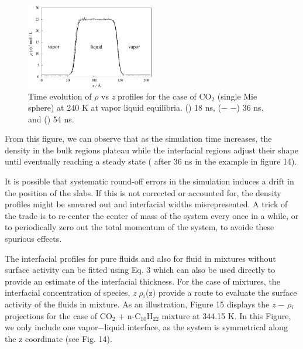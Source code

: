 \documentclass[9pt,bestpractices]{livecoms}
\begin{document}
\begin{figure}
\includegraphics[width=0.5\textwidth]{gfx/Fig_14_2.jpeg}
\caption{Time evolution of {${\rho}$} vs \textit{z} profiles for the case of CO$_{2}$ (single Mie sphere) at 240 K at vapor \textendash{} liquid equilibria. ({\textbullet}{\textbullet}{\textbullet}) 18 ns, (${-}$ ${-}$) 36 ns, and (\textemdash) 54 ns.}
\label{fig:8}
\end{figure}

From this figure, we can observe that as the simulation time increases, the
density in the bulk regions plateau while the interfacial regions adjust their
shape until eventually reaching a steady state ( after 36 ns in the example in
figure 14). 

It is possible that systematic round-off errors in the simulation induces a drift
in the position of the slabs. If this is not corrected or accounted for, the
density profiles might be smeared out and interfacial widths misrepresented.
A trick of the trade is to re-center the center of mass of the system every
once in a while, or to periodically zero out the total momentum of the system,
to avoide these spurious effects.

The interfacial profiles for pure fluids and also for fluid in mixtures without
surface activity can be fitted using Eq. 3 which can also be used directly to
provide an estimate of the interfacial thickness. For the case of mixtures, the
interfacial concentration of species, \textit{z} \textendash{}
{${\rho}$}$_{i}$(z) provide a route to evaluate the surface activity of the
fluids in mixture. As an illustration, Figure 15 displays the \textit{z} ${-}$
${\rho}$$_{i}$ projections for the case of CO$_{2}$ + n-C$_{10}$H$_{22}$
mixture at 344.15 K. In this Figure, we only include one vapor${-}$liquid
interface, as the system is symmetrical along the z coordinate (see Fig. 14). 
\end{document}
